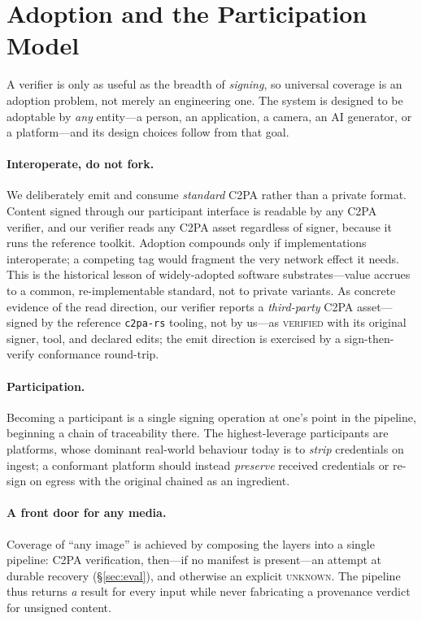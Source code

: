 \documentclass[11pt]{article}
\newcommand{\state}[1]{\textsc{#1}}
\begin{document}
\section{Adoption and the Participation Model}\label{sec:adoption}
A verifier is only as useful as the breadth of \emph{signing}, so universal coverage is an
adoption problem, not merely an engineering one. The system is designed to be adoptable by
\emph{any} entity---a person, an application, a camera, an AI generator, or a platform---and
its design choices follow from that goal.

\paragraph{Interoperate, do not fork.} We deliberately emit and consume \emph{standard} C2PA
rather than a private format. Content signed through our participant interface is readable by
any C2PA verifier, and our verifier reads any C2PA asset regardless of signer, because it
runs the reference toolkit. Adoption compounds only if implementations interoperate; a
competing tag would fragment the very network effect it needs. This is the historical lesson
of widely-adopted software substrates---value accrues to a common, re-implementable standard,
not to private variants. As concrete evidence of the read direction, our verifier reports a
\emph{third-party} C2PA asset---signed by the reference \texttt{c2pa-rs} tooling, not by
us---as \state{verified} with its original signer, tool, and declared edits; the emit
direction is exercised by a sign-then-verify conformance round-trip.

\paragraph{Participation.} Becoming a participant is a single signing operation at one's
point in the pipeline, beginning a chain of traceability there. The highest-leverage
participants are platforms, whose dominant real-world behaviour today is to \emph{strip}
credentials on ingest; a conformant platform should instead \emph{preserve} received
credentials or re-sign on egress with the original chained as an ingredient.

\paragraph{A front door for any media.} Coverage of ``any image'' is achieved by composing
the layers into a single pipeline: C2PA verification, then---if no manifest is present---an
attempt at durable recovery (\S\ref{sec:eval}), and otherwise an explicit \state{unknown}.
The pipeline thus returns \emph{a} result for every input while never fabricating a
provenance verdict for unsigned content.
\end{document}
